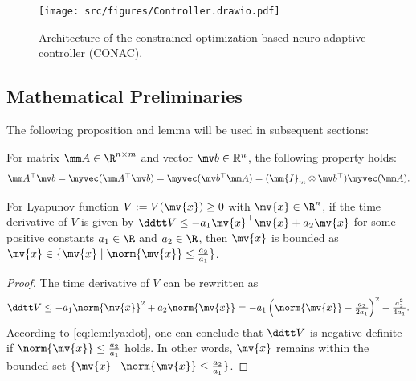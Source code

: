 \documentclass[lettersize,journal]{IEEEtran}
\begin{document}
\begin{figure}[!t]
    \centering
    \texttt{[image: src/figures/Controller.drawio.pdf]}
    \caption{Architecture of the constrained optimization-based neuro-adaptive controller (CONAC).}
    \label{fig:ctrl:diagram}
\end{figure}

\subsection{Mathematical Preliminaries}\label{sec:sub:math preliminaries}

The following proposition and lemma will be used in subsequent sections:

\begin{propsit} \label{propsit:kron}
	For matrix $\mm A\in\R^{n\times m}$ and vector $\mv b\in\mathbb R^n$, the following property holds:
	\begin{equation}
		\mm A^\top \mv b 
		= 
		\myvec(\mm A^\top\mv b)
		=
		\myvec(\mv b^\top\mm A)
		= 
		(\mm{I}_{m}\otimes \mv b^\top) \myvec(\mm A)
		.
	\end{equation}
\end{propsit}


\begin{lem} \label{lem:stable:set}
    For Lyapunov function $V:=V(\mv{x})\ge0$ with $\mv{x}\in\R^n$, if the time derivative of $V$ is given by $\ddtt V\le -a_1 \mv{x}^\top \mv{x} + a_2 \mv{x}$ for some positive constants $a_1\in\R$ and $a_2\in\R$, then $\mv{x}$ is bounded as $\mv{x}\in\{\mv{x}\mid\norm{\mv{x}}\le\tfrac{a_2}{a_1}\}$.
\end{lem}

\begin{proof}
    The time derivative of $V$ can be rewritten as
    \begin{equation}
        \ddtt V
        \le
        -a_1 \norm{\mv{x}}^2 + a_2 \norm{\mv{x}}
        =
        -a_1
        \left(
            \norm{\mv{x}}-\tfrac{a_2}{2a_1}
        \right)^2
        -
        \tfrac{a_2^2}{4a_1}
        .
        \label{eq:lem:lya:dot}
    \end{equation}
    According to \eqref{eq:lem:lya:dot}, one can conclude that $\ddtt V$ is negative definite if $\norm{\mv{x}}\le\tfrac{a_2}{a_1}$ holds.
    In other words, $\mv{x}$ remains within the bounded set $\{\mv{x}\mid\norm{\mv{x}}\le\tfrac{a_2}{a_1}\}$.
\end{proof}
\end{document}
